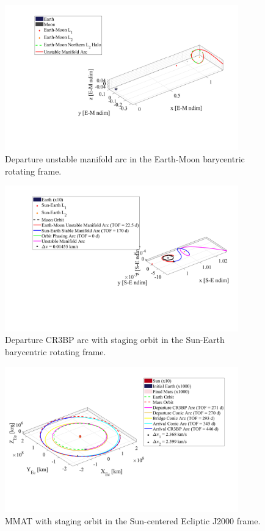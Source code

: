 \begin{figure}[ht]
    \centering
    \includegraphics[width=0.9\textwidth]{figures/StagedEM.pdf}
    \caption{Departure unstable manifold arc in the Earth-Moon barycentric rotating frame.}
    \label{fig:stagedEM}
\end{figure}

\begin{figure}[ht]
    \centering
    \includegraphics[width=0.9\textwidth]{figures/StagedSE.pdf}
    \caption{Departure CR3BP arc with staging orbit in the Sun-Earth barycentric rotating frame.}
    \label{fig:stagedSE}
\end{figure}

\begin{figure}[ht]
    \centering
    \includegraphics[width=0.9\textwidth]{figures/StagedMMAT.pdf}
    \caption{MMAT with staging orbit in the Sun-centered Ecliptic J2000 frame.}
    \label{fig:stagedMMAT}
\end{figure}


